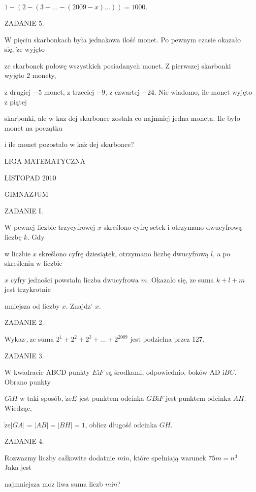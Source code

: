 \documentclass[a4paper,12pt]{article}
\begin{document}
$1-(2-(3-\ldots-(2009-x)\ldots))=1000.$

ZADANIE 5.

$\mathrm{W}$ pięciu skarbonkach była jednakowa ilość monet. Po pewnym czasie okazało się, $\dot{\mathrm{z}}\mathrm{e}$ wyjęto

ze skarbonek połowę wszystkich posiadanych monet. Z pierwszej skarbonki wyjęto 2 monety,

z drugiej $-5$ monet, z trzeciej $-9$, z czwartej $-24$. Nie wiadomo, ile monet wyjęto z piątej

skarbonki, ale w $\mathrm{k}\mathrm{a}\dot{\mathrm{z}}$ dej skarbonce zostala co najmniej jedna moneta. Ile było monet na początku

i ile monet pozostało w $\mathrm{k}\mathrm{a}\dot{\mathrm{z}}$ dej skarbonce?






LIGA MATEMATYCZNA

LISTOPAD 2010

GIMNAZJUM

ZADANIE I.

$\mathrm{W}$ pewnej liczbie trzycyfrowej $x$ skreślono cyfrę setek i otrzymano dwucyfrową liczbę $k$. Gdy

w liczbie $x$ skrešlono cyfrę dziesiątek, otrzymano liczbę dwucyfrową $l$, a po skreśleniu w liczbie

$x$ cyfry jednošci powstała liczba dwucyfrowa $m$. Okazalo się, $\dot{\mathrm{z}}\mathrm{e}$ suma $k+l+m$ jest trzykrotnie

mniejsza od liczby $x$. Znajdz' $x.$

ZADANIE 2.

Wykaz$\cdot, \dot{\mathrm{z}}\mathrm{e}$ suma $2^{1}+2^{2}+2^{3}+\ldots+2^{2009}$ jest podzielna przez 127.

ZADANIE 3.

$\mathrm{W}$ kwadracie ABCD punkty $E\mathrm{i}F$ są środkami, odpowiednio, boków AD $\mathrm{i}BC$. Obrano punkty

$G\mathrm{i}H$ w taki sposób, $\dot{\mathrm{z}}\mathrm{e}E$ jest punktem odcinka $GB\mathrm{i}F$ jest punktem odcinka $AH$. Wiedząc,

$\dot{\mathrm{z}}\mathrm{e}|GA|=|AB|=|BH|=1$, oblicz długość odcinka $GH.$

ZADANIE 4.

Rozwazmy liczby całkowite dodatnie $m \mathrm{i} n$, które spełniają warunek $75m = n^{3}$ Jaka jest

najmniejsza $\mathrm{m}\mathrm{o}\dot{\mathrm{z}}$ liwa suma liczb $m\mathrm{i}n$?
\end{document}

